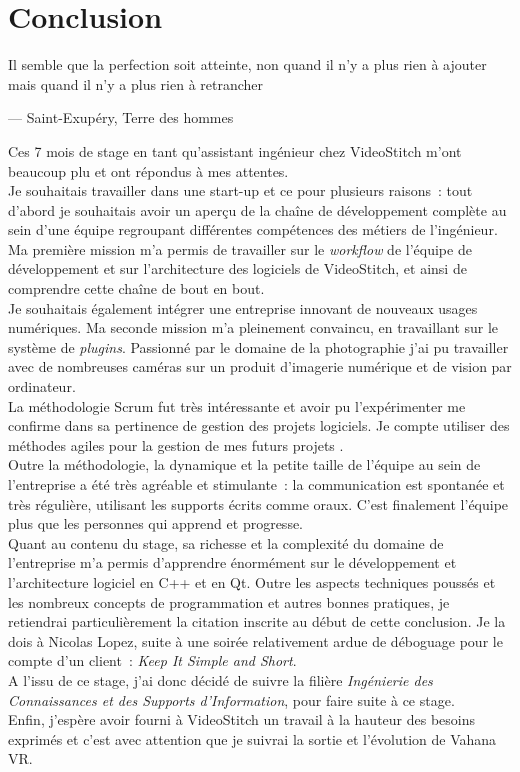 \chapter{Conclusion}
\epigraph{Il semble que la perfection soit atteinte, non quand il n'y a plus 
rien à ajouter mais quand il n'y a plus rien à retrancher}{--- \small{\textup{Saint-Exupéry,
Terre des hommes}}}

Ces 7 mois de stage en tant qu'assistant ingénieur chez VideoStitch m'ont beaucoup
plu et ont répondus à mes attentes.\\
Je souhaitais travailler dans une start-up et ce pour plusieurs raisons~: tout d'abord
je souhaitais avoir un aperçu de la chaîne de développement complète au sein d'une
équipe regroupant différentes compétences des métiers de l'ingénieur. Ma première
mission m'a permis de travailler sur le \textit{workflow} de l'équipe de développement
et sur l'architecture des logiciels de VideoStitch, et ainsi de comprendre cette chaîne
de bout en bout.\\
Je souhaitais également intégrer une entreprise innovant de nouveaux usages
numériques. Ma seconde mission m'a pleinement convaincu, en travaillant sur le 
système de \textit{plugins}. Passionné par le domaine de la photographie j'ai pu 
travailler avec de nombreuses caméras sur un produit d'imagerie numérique
et de vision par ordinateur.\\
\newline
La méthodologie Scrum fut très intéressante et avoir pu l'expérimenter me confirme
dans sa pertinence de gestion des projets logiciels. Je compte utiliser des méthodes
agiles pour la gestion de mes futurs projets .\\
Outre la méthodologie, la dynamique et la petite taille de l'équipe au sein de l'entreprise
a été très agréable et stimulante~: la communication est spontanée et très régulière,
utilisant les supports écrits comme oraux. C'est finalement l'équipe plus que les 
personnes qui apprend et progresse.\\
Quant au contenu du stage, sa richesse et la complexité du domaine de l'entreprise
m'a permis d'apprendre énormément sur le développement et l'architecture logiciel 
en C++ et en Qt. Outre les aspects techniques poussés et les nombreux concepts de
programmation et autres bonnes pratiques, je retiendrai particulièrement la citation 
inscrite au début de cette conclusion. Je la dois à Nicolas Lopez, suite à une soirée
relativement ardue de déboguage pour le compte d'un client~: \textit{Keep It Simple and Short}.\\
\newline
A l'issu de ce stage, j'ai donc décidé de suivre la filière \emph{Ingénierie
des Connaissances et des Supports d'Information}, pour faire suite à ce stage.\\
Enfin, j'espère avoir fourni à VideoStitch un travail à la hauteur des besoins
exprimés et c'est avec attention que je suivrai la sortie et l'évolution de Vahana VR.

